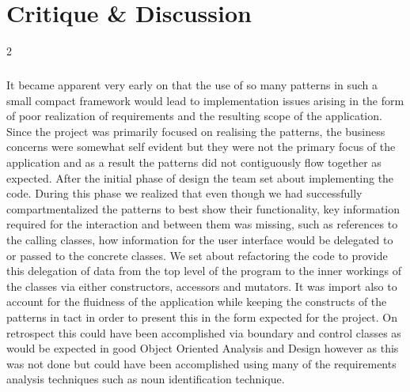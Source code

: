 \chapter{Critique \& Discussion}
	\vspace{3mm}
	\begin{multicols}{2}
		\paragraph{}
			It became apparent very early on that the use of so many patterns in such a small compact framework would lead to implementation 
			issues arising in the form of poor realization of requirements and the resulting scope of the application. Since the project was 
			primarily focused on realising the patterns, the business concerns were somewhat self evident but they were not the primary focus 
			of the application and as a result the patterns did not contiguously flow together as expected.   
			\newline
			\newline
			After the initial phase of design the team set about implementing the code.  During this phase we realized that  even though we had 
			successfully compartmentalized the patterns to best show their functionality, key information required for the interaction and between 
			them was missing, such as references to the calling classes, how information for the user interface would be delegated to or 
			passed to the concrete classes.
			\newline
			\newline
			We set about refactoring the code to provide this delegation of data from the top level of the program to the inner workings 
			of the classes via either constructors, accessors and mutators.  It was import also to account for the fluidness of the application 
			while keeping the constructs of the patterns in tact in order to present this in the form expected for the project.
			\newline
			\newline
			On retrospect this could have been accomplished via boundary and control classes as would be expected in good Object Oriented 
			Analysis and Design however as this was not done but could have been accomplished using many of the requirements analysis 
			techniques such as noun identification technique.
			\newline
			\newline

\end{multicols}
